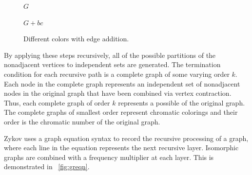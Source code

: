 \begin{figure}[H]
  \begin{minipage}{2.5in}
    \centering

    \(G\)
  \end{minipage}
  \begin{minipage}{2.5in}
    \centering

    \(G+bc\)
  \end{minipage}
  \caption{Different colors with edge addition.}
  \label{fig:zeadd}
\end{figure}

By applying these steps recursively, all of the possible partitions of the nonadjacent vertices to independent sets
are generated.  The termination condition for each recursive path is a complete graph of some varying order \(k\).
Each node in the complete graph represents an independent set of nonadjacent nodes in the original graph that have
been combined via vertex contraction.  Thus, each complete graph of order \(k\) represents a possible 
of the original graph.  The complete graphs of smallest order represent chromatic colorings and their order is the
chromatic number of the original graph.

Zykov uses a graph equation syntax to record the recursive processing of a graph, where each line in the equation
represents the next recursive layer.  Isomorphic graphs are combined with a frequency multiplier at each layer.
This is demonstrated in \figurename~\ref{fig:greqn}.

